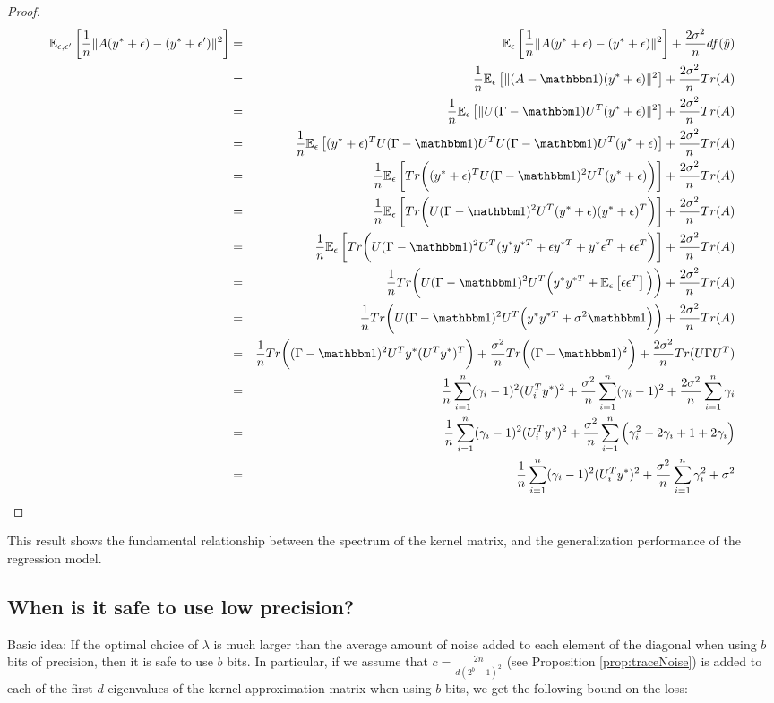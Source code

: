 \documentclass[12pt]{article}
\newcommand{\hy}{\hat{y}}
\newcommand{\eps}{\epsilon}
\begin{document}
\begin{proof}
\begin{eqnarray*}
	\expect{\epsilon,\epsilon'}{\frac{1}{n}\|A(y^*+\eps) - (y^*+\eps')\|^2} 
	&=& \expect{\epsilon}{\frac{1}{n}\|A(y^*+\eps) - (y^*+\eps)\|^2} + \frac{2\sigma^2}{n}df(\hy) \\
	&=& \frac{1}{n}\expect{\epsilon}{\|(A-\id)(y^*+\eps)\|^2} + \frac{2\sigma^2}{n}Tr(A) \\
	&=& \frac{1}{n}\expect{\epsilon}{\|U(\Gamma-\id)U^T(y^*+\eps)\|^2} + \frac{2\sigma^2}{n}Tr(A) \\
	&=& \frac{1}{n}\expect{\epsilon}{(y^*+\eps)^TU(\Gamma-\id)U^TU(\Gamma-\id)U^T(y^*+\eps)} + \frac{2\sigma^2}{n}Tr(A) \\
	&=& \frac{1}{n}\expect{\epsilon}{Tr\bigg((y^*+\eps)^TU(\Gamma-\id)^2 U^T(y^*+\eps)\bigg)} + \frac{2\sigma^2}{n}Tr(A) \\
	&=& \frac{1}{n}\expect{\epsilon}{Tr\bigg(U(\Gamma-\id)^2 U^T(y^*+\eps)(y^*+\eps)^T\bigg)} + \frac{2\sigma^2}{n}Tr(A) \\
	&=& \frac{1}{n}\expect{\epsilon}{Tr\bigg(U(\Gamma-\id)^2 U^T(y^* y^{*T} + \eps y^{*T} + y^*\eps^T + \eps \eps^T\bigg)} + \frac{2\sigma^2}{n}Tr(A) \\
	&=& \frac{1}{n}Tr\bigg(U(\Gamma-\id)^2 U^T\Big(y^* y^{*T} + \expect{\epsilon}{ \eps \eps^T}\Big)\bigg) + \frac{2\sigma^2}{n}Tr(A) \\
	&=& \frac{1}{n}Tr\bigg(U(\Gamma-\id)^2 U^T\Big(y^* y^{*T} + \sigma^2 \id \Big)\bigg) + \frac{2\sigma^2}{n}Tr(A) \\
	&=& \frac{1}{n}Tr\bigg((\Gamma-\id)^2 U^T y^* (U^T y^*)^T\bigg)  + \frac{\sigma^2}{n}Tr\bigg((\Gamma-\id)^2\bigg) + \frac{2\sigma^2}{n}Tr(U\Gamma U^T) \\
	&=& \frac{1}{n}\sum_{i=1}^n (\gamma_i-1)^2 (U_i^T y^*)^2 + \frac{\sigma^2}{n}\sum_{i=1}^n (\gamma_i-1)^2 + \frac{2\sigma^2}{n}\sum_{i=1}^n \gamma_i\\
	&=& \frac{1}{n}\sum_{i=1}^n (\gamma_i-1)^2 (U_i^T y^*)^2 + \frac{\sigma^2}{n}\sum_{i=1}^n \Big(\gamma_i^2 -2\gamma_i + 1 + 2\gamma_i\Big) \\
	&=& \frac{1}{n}\sum_{i=1}^n (\gamma_i-1)^2 (U_i^T y^*)^2 + \frac{\sigma^2}{n}\sum_{i=1}^n \gamma_i^2 + \sigma^2
\end{eqnarray*}
\end{proof}

This result shows the fundamental relationship between the spectrum of the kernel matrix, and the generalization performance of the regression model.

\subsection{When is it safe to use low precision?}
Basic idea: If the optimal choice of $\lambda$ is much larger than the average amount of noise added to each element of the diagonal when using $b$ bits of precision, then it is safe to use $b$ bits.  In particular, if we assume that $c = \frac{2n}{d(2^b -1)^2}$ (see Proposition \ref{prop:traceNoise}) is added to each of the first $d$ eigenvalues of the kernel approximation matrix when using $b$ bits, we get the following bound on the loss:
\end{document}
